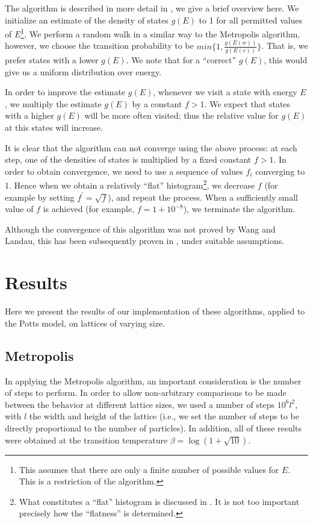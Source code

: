\documentclass{article}
\begin{document}
The algorithm is described in more detail in \cite{WangLandau}, we give a brief overview here.
We initialize an estimate of the density of states $g(E)$ to 1 for all permitted values of $E$\footnote{This assumes that there are only a finite number of possible values for $E$. This is a restriction of the algorithm.}.
We perform a random walk in a similar way to the Metropolis algorithm, however, we choose the transition probability to be $min\{1, \frac{g(E(w))}{g(E(v))}\}$.
That is, we prefer states with a lower $g(E)$.
We note that for a ``correct'' $g(E)$, this would give us a uniform distribution over energy.

In order to improve the estimate $g(E)$, whenever we visit a state with energy $E$, we multiply the estimate $g(E)$ by a constant $f>1$.
We expect that states with a higher $g(E)$ will be more often visited; thus the relative value for $g(E)$ at this states will increase.

It is clear that the algorithm can not converge using the above process: at each step, one of the densities of states is multiplied by a fixed constant $f>1$.
In order to obtain convergence, we need to use a sequence of values $f_i$ converging to 1.
Hence when we obtain a relatively ``flat'' histogram\footnote{What constitutes a ``flat'' histogram is discussed in \cite{WangLandau}. It is not too important precisely how the ``flatness'' is determined.}, we decrease $f$ (for example by setting $f^\prime = \sqrt{f}$), and repeat the process.
When a sufficiently small value of $f$ is achieved (for example, $f = 1 + 10^{-8}$), we terminate the algorithm.

Although the convergence of this algorithm was not proved by Wang and Landau, this has been subsequently proven in , under suitable assumptions. %

\section{Results}
Here we present the results of our implementation of these algorithms, applied to the Potts model, on lattices of varying size.

\subsection{Metropolis}
In applying the Metropolis algorithm, an important consideration is the number of steps to perform.
In order to allow non-arbitrary comparisons to be made between the behavior at different lattice sizes, we used a number of steps $10^6l^2$, with $l$ the width and height of the lattice (i.e., we set the number of steps to be directly proportional to the number of particles).
In addition, all of these results were obtained at the transition temperature $\beta = \log(1+\sqrt{10})$.
\end{document}

